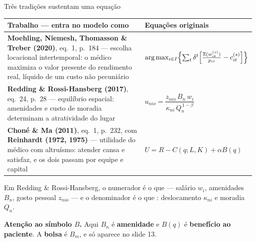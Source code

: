 \documentclass[aspectratio=169,10pt]{beamer}
\begin{document}
\begin{frame}{Três tradições sustentam uma equação}
  \vspace{-0.6em}%
  {\scriptsize\renewcommand{\arraystretch}{1.0}
  \begin{tabularx}{\textwidth}{@{}L >{\centering\arraybackslash}p{0.3\textwidth}@{}}
    \toprule
    \bfseries Trabalho --- entra no modelo como & \bfseries Equações originais \\
    \midrule
    \textbf{Moehling, Niemesh, Thomasson \& Treber (2020)}, eq.~1, p.~184 ---
      escolha locacional intertemporal: o médico maximiza o valor presente do
      rendimento real, líquido de um custo não pecuniário &
      $\arg\max_{i \in I} \Bigl\{ \sum_t \delta^t \Bigl[
        \tfrac{\mathbb{E}(w_{it}^{(s)})}{p_{it}} - c_{it}^{(s)} \Bigr] \Bigr\}$ \\
    \addlinespace[0.15em]
    \textbf{Redding \& Rossi-Hansberg (2017)}, eq.~24, p.~28 --- equilíbrio
      espacial: amenidades e custo de moradia determinam a atratividade do
      lugar &
      $u_{nio} = \dfrac{z_{nio}\, B_n\, w_i}{\kappa_{ni}\, Q_n^{\,1-\beta}}$ \\
    \addlinespace[0.15em]
    \textbf{Choné \& Ma (2011)}, eq.~1, p.~232, com \textbf{Reinhardt (1972,
      1975)} --- utilidade do médico com altruísmo: atender cansa e satisfaz, e
      os dois passam por equipe e capital &
      $U = R - C(q; L, K) + \alpha B(q)$ \\
    \bottomrule
  \end{tabularx}}

  \vspace{0.15em}
  {\footnotesize Em Redding \& Rossi-Hansberg, o numerador é o que
   --- salário $w_i$, amenidades $B_n$, gosto pessoal $z_{nio}$
  --- e o denominador é o que : deslocamento $\kappa_{ni}$ e
  moradia $Q_n$.}

  \vspace{0em}
  \begin{destaque}[0.96\textwidth]
    \scriptsize \textbf{Atenção ao símbolo $B$.} Aqui $B_n$ é \textbf{amenidade} e $B(q)$
    é \textbf{benefício ao paciente}. A \textbf{bolsa} é $B_m$, e só aparece
    no slide 13.
  \end{destaque}

\end{frame}
\end{document}
